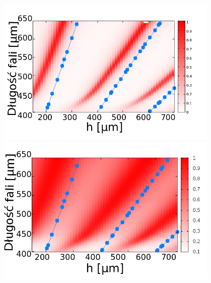 \documentclass{beamer}
\begin{document}
\begin{frame}
\begin{columns}
\begin{column}{0.5\textwidth}
		\end{column}
		\begin{column}{0.5\textwidth}
			\begin{figure}
				\includegraphics[width=.9\textwidth]{../images/antenaThz/rezonant_trans_f01.png}\\
				\includegraphics[width=.9\textwidth]{../images/antenaThz/rezonant_trans_f05.png}\\
			\end{figure}
		\end{column}
	\end{columns}
	{\tiny \cite{martin2001theory}	}
	
\end{frame}
\end{document}
